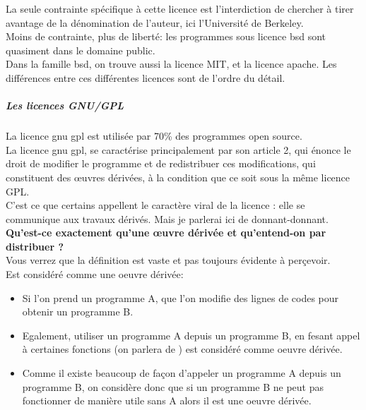 				La seule contrainte spécifique à cette licence est l'interdiction de chercher à tirer avantage de la dénomination de l'auteur, ici l'Université de Berkeley.\\

				Moins de contrainte, plus de liberté: les programmes sous licence \acrshort{bsd} sont quasiment dans le domaine public.\\

				Dans la famille \acrshort{bsd}, on trouve aussi la licence MIT, et la licence \Gls{apache}. Les différences entre ces différentes licences sont de l'ordre du détail.

				\subparagraph{Les licences GNU/GPL\\}

				La licence \acrfull{gnu gpl} est utilisée par 70\% des programmes open source.\\ 
				
				La licence \acrshort{gnu gpl}, se caractérise principalement par son article 2, qui énonce le droit de modifier le programme et de redistribuer ces modifications, qui constituent des œuvres dérivées, à la condition que ce soit sous la même licence GPL. \\
				
				C'est ce que certains appellent le caractère viral de la licence : elle se communique aux travaux dérivés. Mais je parlerai ici de donnant-donnant. \\
				
				\textbf{Qu'est-ce exactement qu'une œuvre dérivée et qu'entend-on par distribuer ?}\\

				Vous verrez que la définition est vaste et pas toujours évidente à perçevoir.\\

				Est considéré comme une oeuvre dérivée:

				\begin{itemize}[label=\textbullet, font=\LARGE \color{burntorange}]
					\item Si l'on prend un programme A, que l'on modifie des lignes de codes pour obtenir un programme B.

					\item Egalement, utiliser un programme A depuis un programme B, en fesant appel à certaines fonctions (on parlera de ) est considéré comme oeuvre dérivée.

					\item Comme il existe beaucoup de façon d'appeler un programme A depuis un programme B, on considère donc que si un programme B ne peut pas fonctionner de manière utile sans A alors il est une oeuvre dérivée.
				\end{itemize} 

